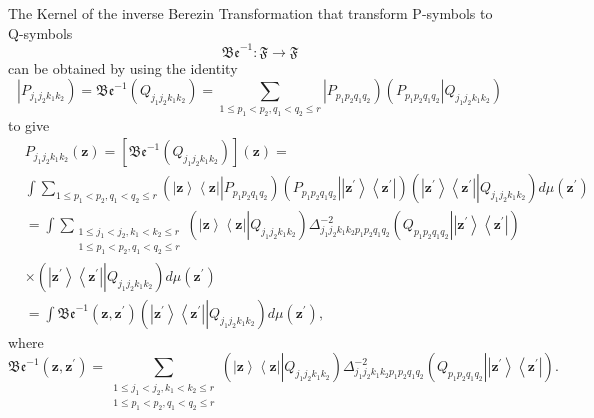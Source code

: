 \documentclass[aps,preprint]{revtex4}%
\begin{document}
The Kernel of the inverse Berezin Transformation that transform P-symbols to
Q-symbols
\begin{equation}
\mathfrak{Be}^{-1}:\mathfrak{F}\rightarrow\mathfrak{F}%
\end{equation}
can be obtained by using the identity
\begin{equation}
\left\vert P_{j_{1}j_{2}k_{1}k_{2}}\right)  =\mathfrak{Be}^{-1}\left(
Q_{j_{1}j_{2}k_{1}k_{2}}\right)  =\sum_{1\leq p_{1}<p_{2},q_{1}<q_{2}\leq
r}\left\vert P_{p_{1}p_{2}q_{1}q_{2}}\right)  \left(  \left.  P_{p_{1}%
p_{2}q_{1}q_{2}}\right\vert Q_{j_{1}j_{2}k_{1}k_{2}}\right)
\end{equation}
to give%
\begin{align}
&  P_{j_{1}j_{2}k_{1}k_{2}}\left(  \mathbf{z}\right)  =\left[  \mathfrak{Be}%
^{-1}\left(  Q_{j_{1}j_{2}k_{1}k_{2}}\right)  \right]  \left(  \mathbf{z}%
\right)  =\nonumber\\
&  \int\sum_{1\leq p_{1}<p_{2},q_{1}<q_{2}\leq r}\left(  \left\vert
\mathbf{z}\right\rangle \left\langle \mathbf{z}\right\vert \left\vert
P_{p_{1}p_{2}q_{1}q_{2}}\right.  \right)  \left(  \left.  P_{p_{1}p_{2}%
q_{1}q_{2}}\right\vert \left\vert \mathbf{z}^{\prime}\right\rangle
\left\langle \mathbf{z}^{\prime}\right\vert \right)  \left(  \left\vert
\mathbf{z}^{\prime}\right\rangle \left\langle \mathbf{z}^{\prime}\right\vert
\left\vert Q_{j_{1}j_{2}k_{1}k_{2}}\right.  \right)  d\mu\left(
\mathbf{z}^{\prime}\right) \nonumber\\
&  =\int\sum_{\substack{1\leq j_{1}<j_{2},k_{1}<k_{2}\leq r\\1\leq p_{1}%
<p_{2},q_{1}<q_{2}\leq r}}\left(  \left\vert \mathbf{z}\right\rangle
\left\langle \mathbf{z}\right\vert \left\vert Q_{j_{1}j_{2}k_{1}k_{2}}\right.
\right)  \Delta_{j_{1}j_{2}k_{1}k_{2}p_{1}p_{2}q_{1}q_{2}}^{-2}\left(  \left.
Q_{p_{1}p_{2}q_{1}q_{2}}\right\vert \left\vert \mathbf{z}^{\prime
}\right\rangle \left\langle \mathbf{z}^{\prime}\right\vert \right) \nonumber\\
&  \times\left(  \left\vert \mathbf{z}^{\prime}\right\rangle \left\langle
\mathbf{z}^{\prime}\right\vert \left\vert Q_{j_{1}j_{2}k_{1}k_{2}}\right.
\right)  d\mu\left(  \mathbf{z}^{\prime}\right) \nonumber\\
&  =\int\mathfrak{Be}^{-1}\left(  \mathbf{z,z}^{\prime}\right)  \left(
\left\vert \mathbf{z}^{\prime}\right\rangle \left\langle \mathbf{z}^{\prime
}\right\vert \left\vert Q_{j_{1}j_{2}k_{1}k_{2}}\right.  \right)  d\mu\left(
\mathbf{z}^{\prime}\right)  ,
\end{align}
where
\begin{equation}
\mathfrak{Be}^{-1}\left(  \mathbf{z,z}^{\prime}\right)  =\sum_{\substack{1\leq
j_{1}<j_{2},k_{1}<k_{2}\leq r\\1\leq p_{1}<p_{2},q_{1}<q_{2}\leq r}}\left(
\left\vert \mathbf{z}\right\rangle \left\langle \mathbf{z}\right\vert
\left\vert Q_{j_{1}j_{2}k_{1}k_{2}}\right.  \right)  \Delta_{j_{1}j_{2}%
k_{1}k_{2}p_{1}p_{2}q_{1}q_{2}}^{-2}\left(  \left.  Q_{p_{1}p_{2}q_{1}q_{2}%
}\right\vert \left\vert \mathbf{z}^{\prime}\right\rangle \left\langle
\mathbf{z}^{\prime}\right\vert \right)  .
\end{equation}
\end{document}
